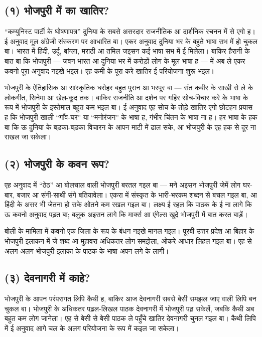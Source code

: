 \documentclass[12pt,a4paper,oneside]{book}
\begin{document}
\subsection*{(१) भोजपुरी में का खातिर?}
“कम्युनिस्ट पार्टी के घोषणापत्र” दुनिया के सबसे असरदार राजनीतिक आ दार्शनिक रचनन में से एगो ह। ई अनुवाद मूल अंग्रेजी संस्करण पर आधारित बा। एकर अनुवाद दुनिया भर के बहुते भाषा सभ में हो चुकल बा। भारत में हिंदी, उर्दू, बांग्ला, मराठी आ तमिल जइसन कई भाषा सभ में ई मिलेला। बाकिर हैरानी के बात बा कि भोजपुरी — जवन भारत आ दुनिया भर में करोड़ों लोग के मूल भाषा ह — में अब ले एकर कवनो पूरा अनुवाद नइखे भइल। एह कमी के पूरा करे खातिर ई परियोजना शुरू भइल।

भोजपुरी के ऐतिहासिक आ सांस्कृतिक धरोहर बहुत पुरान आ भरपूर बा — संत कबीर के साखी से ले के लोकगीत, सिनेमा आ खेल-कूद तक। बाकिर राजनीति आ दर्शन पर गहिर सोच-विचार करे के भाषा के रूप में भोजपुरी के इस्तेमाल बहुत कम भइल बा। ई अनुवाद एह सोच के तोड़े खातिर एगो छोटहन प्रयास ह कि भोजपुरी खाली “गाँव-घर” या “मनोरंजन” के भाषा ह, गंभीर चिंतन के भाषा ना ह। हर भाषा के हक बा कि ऊ दुनिया के बड़का-बड़का विचारन के आपन माटी में ढाल सके, आ भोजपुरी के एह हक से दूर ना राखल जा सकेला।


\subsection*{(२) भोजपुरी के कवन रूप?}
एह अनुवाद में “ठेठ” आ बोलचाल वाली भोजपुरी बरतल गइल बा — मने अइसन भोजपुरी जेमें लोग घर-बार, बजार आ संगी-साथी संगे बतियावेला। एकरा में संस्कृत के भारी-भरकम शब्दन से बचल गइल बा, आ हिंदी के असर भी जेतना हो सके ओतने कम रखल गइल बा। लक्ष्य ई रहल कि पाठक के ई ना लागे कि ऊ कवनो अनुवाद पढ़त बा; बलुक अइसन लागे कि मार्क्स आ एंगेल्स खुदे भोजपुरी में बात करत बाड़ें।

बोली के मामिला में कवनो एक जिला के रूप के बंधन नइखे मानल गइल। पूरबी उत्तर प्रदेश आ बिहार के भोजपुरी इलाकन में जे शब्द आ मुहावरा अधिकतर लोग समझेला, ओकरे आधार लिहल गइल बा। एह से अलग-अलग भोजपुरी इलाका के पाठक के भाषा अपन लगे के लागी।


\subsection*{(३) देवनागरी में काहे?}
भोजपुरी के आपन परंपरागत लिपि कैथी ह, बाकिर आज देवनागरी सबसे बेसी समझल जाए वाली लिपि बन चुकल बा। भोजपुरी के अधिकतर पढ़ल-लिखल पाठक देवनागरी में भोजपुरी पढ़ सकेलें, जबकि कैथी अब बहुत कम लोग जानेला। एह से बेसी से बेसी पाठक ले पहुँचे खातिर देवनागरी चुनल गइल बा। कैथी लिपि में ई अनुवाद आगे चल के अलग परियोजना के रूप में कइल जा सकेला।
\end{document}

